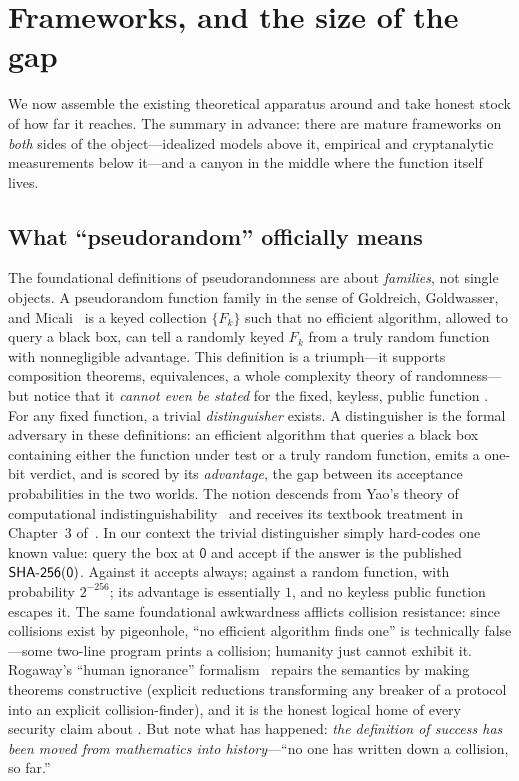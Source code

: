 \section{Frameworks, and the size of the gap}\label{sec:frameworks}

We now assemble the existing theoretical apparatus around \SHA{} and take
honest stock of how far it reaches. The summary in advance: there are
mature frameworks on \emph{both} sides of the object---idealized models
above it, empirical and cryptanalytic measurements below it---and a
canyon in the middle where the function itself lives.

\subsection{What ``pseudorandom'' officially means}
\label{sec:definitions}

The foundational definitions of pseudorandomness are about
\emph{families}, not single objects. A pseudorandom function family in
the sense of Goldreich, Goldwasser, and Micali~\citep{GGM1986} is a keyed
collection $\{F_k\}$ such that no efficient algorithm, allowed to query a
black box, can tell a randomly keyed $F_k$ from a truly random function
with nonnegligible advantage. This definition is a triumph---it supports
composition theorems, equivalences, a whole complexity theory of
randomness---but notice that it \emph{cannot even be stated} for the
fixed, keyless, public function \SHA{}. For any fixed function, a trivial
\emph{distinguisher} exists. A distinguisher is the formal adversary in
these definitions: an efficient algorithm that queries a black box
containing either the function under test or a truly random function,
emits a one-bit verdict, and is scored by its \emph{advantage}, the gap
between its acceptance probabilities in the two worlds. The notion
descends from Yao's theory of computational
indistinguishability~\citep{Yao1982} and receives its textbook treatment
in Chapter~3 of~\citet{Goldreich2001}. In our context the trivial
distinguisher simply hard-codes one known value: query the box at
$\mathsf{0}$ and accept if the answer is the published
$\textsf{SHA-256}(\mathsf{0})$. Against \SHA{} it accepts always; against a random
function, with probability $2^{-256}$; its advantage is essentially $1$,
and no keyless public function escapes it. The same
foundational awkwardness afflicts collision resistance: since collisions
exist by pigeonhole, ``no efficient algorithm finds one'' is technically
false---some two-line program prints a collision; humanity just cannot
exhibit it. Rogaway's ``human ignorance'' formalism~\citep{Rogaway2006}
repairs the semantics by making theorems constructive (explicit
reductions transforming any breaker of a protocol into an explicit
collision-finder), and it is the honest logical home of every security
claim about \SHA{}. But note what has happened: \emph{the definition of
success has been moved from mathematics into history}---``no one has
written down a collision, so far.''

